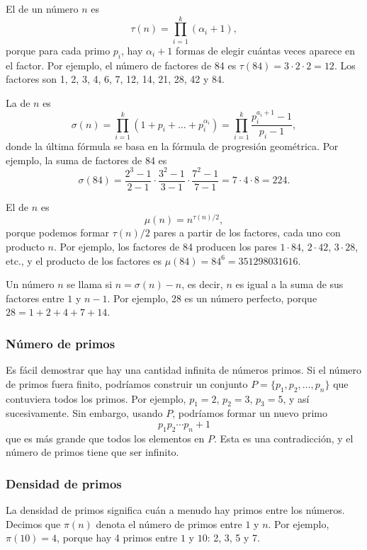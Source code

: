 El  de un número $n$ es
\[\tau(n)=\prod_{i=1}^k (\alpha_i+1),\]
porque para cada primo $p_i$, hay
$\alpha_i+1$ formas de elegir cuántas veces
aparece en el factor.
Por ejemplo, el número de factores
de 84 es
$\tau(84)=3 \cdot 2 \cdot 2 = 12$.
Los factores son
1, 2, 3, 4, 6, 7, 12, 14, 21, 28, 42 y 84.

La  de $n$ es
\[\sigma(n)=\prod_{i=1}^k (1+p_i+\ldots+p_i^{\alpha_i}) = \prod_{i=1}^k \frac{p_i^{a_i+1}-1}{p_i-1},\]
donde la última fórmula se basa en la fórmula de progresión geométrica.
Por ejemplo, la suma de factores de 84 es
\[\sigma(84)=\frac{2^3-1}{2-1} \cdot \frac{3^2-1}{3-1} \cdot \frac{7^2-1}{7-1} = 7 \cdot 4 \cdot 8 = 224.\]

El  de $n$ es
\[\mu(n)=n^{\tau(n)/2},\]
porque podemos formar $\tau(n)/2$ pares a partir de los factores,
cada uno con producto $n$.
Por ejemplo, los factores de 84
producen los pares
$1 \cdot 84$, $2 \cdot 42$, $3 \cdot 28$, etc.,
y el producto de los factores es $\mu(84)=84^6=351298031616$.


Un número $n$ se llama  si $n=\sigma(n)-n$,
es decir, $n$ es igual a la suma de sus factores
entre $1$ y $n-1$.
Por ejemplo, 28 es un número perfecto,
porque $28=1+2+4+7+14$.

\subsubsection{Número de primos}

Es fácil demostrar que hay una cantidad infinita
de números primos.
Si el número de primos fuera finito,
podríamos construir un conjunto $P=\{p_1,p_2,\ldots,p_n\}$
que contuviera todos los primos.
Por ejemplo, $p_1=2$, $p_2=3$, $p_3=5$, y así sucesivamente.
Sin embargo, usando $P$, podríamos formar un nuevo primo
\[p_1 p_2 \cdots p_n+1\]
que es más grande que todos los elementos en $P$.
Esta es una contradicción, y el número de primos
tiene que ser infinito.

\subsubsection{Densidad de primos}

La densidad de primos significa cuán a menudo hay primos
entre los números.
Decimos que $\pi(n)$ denota el número de primos entre
$1$ y $n$. Por ejemplo, $\pi(10)=4$, porque
hay 4 primos entre $1$ y $10$: 2, 3, 5 y 7.

